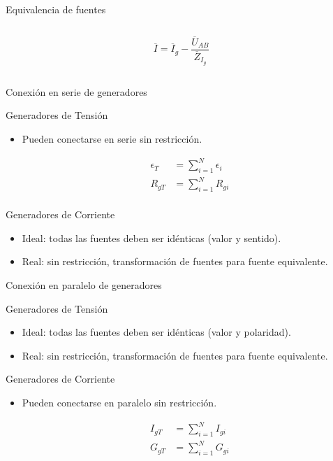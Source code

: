 \documentclass[aspectratio=169, usenames,svgnames,dvipsnames]{beamer}
\begin{document}
\begin{frame}[label={sec:orgc06db2f}]{Equivalencia de fuentes}
\begin{columns}
\begin{column}{0.33\columnwidth}
\begin{center}
\end{center}
\[
  \overline{I} = \overline{I}_g - \frac{\overline{U}_{AB}}{\overline{Z}_{I_g}}
\]
\end{column}
\end{columns}
\end{frame}


\begin{frame}[label={sec:org9799bf0}]{Conexión en serie de generadores}
\begin{block}{Generadores de Tensión}
\begin{itemize}
\item Pueden conectarse en serie sin restricción.

\begin{align*}
  \epsilon_T &= \sum_{i = 1}^N \epsilon_i\\
  R_{gT} &= \sum_{i = 1}^N R_{gi}\\ 
\end{align*}
\end{itemize}
\end{block}

\begin{block}{Generadores de Corriente}
\begin{itemize}
\item Ideal: todas las fuentes deben ser idénticas (valor y sentido).
\item Real:  sin restricción, transformación de fuentes para fuente equivalente.
\end{itemize}
\end{block}
\end{frame}


\begin{frame}[label={sec:org942c707}]{Conexión en paralelo de generadores}
\begin{block}{Generadores de Tensión}
\begin{itemize}
\item Ideal: todas las fuentes deben ser idénticas (valor y polaridad).
\item Real:  sin restricción, transformación de fuentes para fuente equivalente.
\end{itemize}
\end{block}


\begin{block}{Generadores de Corriente}
\begin{itemize}
\item Pueden conectarse en paralelo sin restricción.

\begin{align*}
  I_{gT} &= \sum_{i = 1}^N I_{gi}\\
  G_{gT} &= \sum_{i = 1}^N G_{gi}\\ 
\end{align*}
\end{itemize}
\end{block}
\end{frame}
\end{document}
